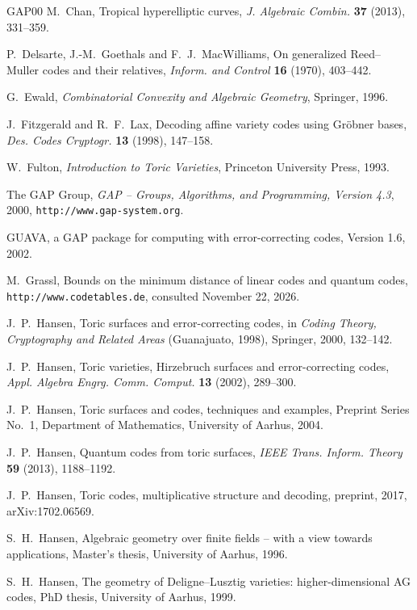 \documentclass[12pt,letterpaper]{article}
\numberwithin{equation}{section}
\theoremstyle{definition}
\theoremstyle{remark}
\begin{document}
\begin{thebibliography}{GAP00}
M.~Chan, Tropical hyperelliptic curves, \emph{J. Algebraic Combin.}
\textbf{37} (2013), 331--359.

P.~Delsarte, J.-M.~Goethals and F.~J.~MacWilliams, On generalized Reed--Muller
codes and their relatives, \emph{Inform. and Control} \textbf{16} (1970),
403--442.

G.~Ewald, \emph{Combinatorial Convexity and Algebraic Geometry}, Springer,
1996.

J.~Fitzgerald and R.~F.~Lax, Decoding affine variety codes using Gr\"obner
bases, \emph{Des. Codes Cryptogr.} \textbf{13} (1998), 147--158.

W.~Fulton, \emph{Introduction to Toric Varieties}, Princeton University
Press, 1993.

The GAP Group, \emph{GAP -- Groups, Algorithms, and Programming, Version
4.3}, 2000, \texttt{http://www.gap-system.org}.

GUAVA, a GAP package for computing with error-correcting codes, Version 1.6,
2002.

M.~Grassl, Bounds on the minimum distance of linear codes and quantum codes,
\texttt{http://www.codetables.de}, consulted November 22, 2026.

J.~P.~Hansen, Toric surfaces and error-correcting codes, in \emph{Coding
Theory, Cryptography and Related Areas} (Guanajuato, 1998), Springer, 2000,
132--142.

J.~P.~Hansen, Toric varieties, Hirzebruch surfaces and error-correcting codes,
\emph{Appl. Algebra Engrg. Comm. Comput.} \textbf{13} (2002), 289--300.

J.~P.~Hansen, Toric surfaces and codes, techniques and examples, Preprint
Series No.~1, Department of Mathematics, University of Aarhus, 2004.

J.~P.~Hansen, Quantum codes from toric surfaces, \emph{IEEE Trans. Inform.
Theory} \textbf{59} (2013), 1188--1192.

J.~P.~Hansen, Toric codes, multiplicative structure and decoding, preprint,
2017, arXiv:1702.06569.

S.~H.~Hansen, Algebraic geometry over finite fields -- with a view towards
applications, Master's thesis, University of Aarhus, 1996.

S.~H.~Hansen, The geometry of Deligne--Lusztig varieties: higher-dimensional
AG codes, PhD thesis, University of Aarhus, 1999.


\end{thebibliography}
\end{document}
